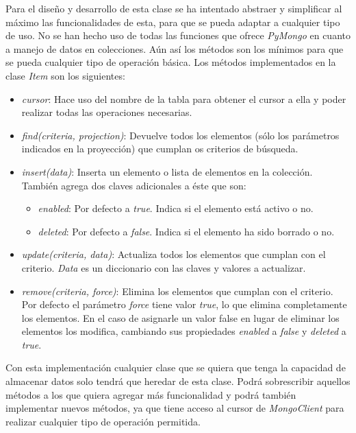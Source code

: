 \bigskip
Para el diseño y desarrollo de esta clase se ha intentado abstraer y simplificar al máximo las funcionalidades de esta, para que se pueda adaptar a cualquier tipo de uso. No se han hecho uso de todas las funciones que ofrece \textit{PyMongo} en cuanto a manejo de datos en colecciones. Aún así los métodos son los mínimos para que se pueda cualquier tipo de operación básica. Los métodos implementados en la clase \textit{Item} son los siguientes:
\begin{itemize}
	\item \textit{cursor}: Hace uso del nombre de la tabla para obtener el cursor a ella y poder realizar todas las operaciones necesarias.
	\item \textit{find(criteria, projection)}: Devuelve todos los elementos (sólo los parámetros indicados en la proyección) que cumplan os criterios de búsqueda.
	\item \textit{insert(data)}: Inserta un elemento o lista de elementos en la colección. También agrega dos claves adicionales a éste que son:
	\begin{itemize}
		\item \textit{enabled}: Por defecto a \textit{true}. Indica si el elemento está activo o no.
		\item \textit{deleted}: Por defecto a \textit{false}. Indica si el elemento ha sido borrado o no.
	\end{itemize}
	\item \textit{update(criteria, data)}: Actualiza todos los elementos que cumplan con el criterio. \textit{Data} es un diccionario con las claves y valores a actualizar.
	\item \textit{remove(criteria, force)}: Elimina los elementos que cumplan con el criterio. Por defecto el parámetro \textit{force} tiene valor \textit{true}, lo que elimina completamente los elementos. En el caso de asignarle un valor false en lugar de eliminar los elementos los modifica, cambiando sus propiedades \textit{enabled} a \textit{false} y \textit{deleted} a \textit{true}.
\end{itemize}



\bigskip
Con esta implementación cualquier clase que se quiera que tenga la capacidad de almacenar datos solo tendrá que heredar de esta clase. Podrá sobrescribir aquellos métodos a los que quiera agregar más funcionalidad y podrá también implementar nuevos métodos, ya que tiene acceso al cursor de \textit{MongoClient} para realizar cualquier tipo de operación permitida.




